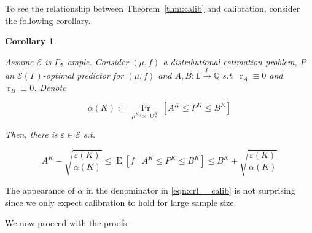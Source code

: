 \documentclass{article}
\numberwithin{equation}{section}
\theoremstyle{definition}
\theoremstyle{plain}
\newtheorem{corollary}{Corollary}[section]
\DeclareMathOperator{\Prb}{Pr}
\DeclareMathOperator{\E}{E}
\DeclareMathOperator{\R}{r}
\DeclareMathOperator{\Un}{U}
\newcommand{\Rats}{\mathbb{Q}}
\newcommand{\GrowA}{\Gamma_{\mathfrak{A}}}
\newcommand{\Fall}{\mathcal{E}}
\newcommand{\EG}{\Fall(\Gamma)}
\newcommand{\Scheme}{\xrightarrow{\Gamma}}
\begin{document}
To see the relationship between Theorem~\ref{thm:calib} and calibration, consider the following corollary.

\begin{corollary}
\label{crl:calib}

Assume $\Fall$ is $\GrowA$-ample. Consider $(\mu,f)$ a distributional estimation problem, $P$ an $\EG$-optimal predictor for $(\mu,f)$ and $A,B: \bm{1} \Scheme \Rats$ s.t. $\R_A \equiv 0$ and $\R_B \equiv 0$. Denote

\[\alpha(K):=\Prb_{\mu^{K_0} \times \Un_P^{K}}[A^{K} \leq P^{K} \leq B^{K}]\] 

Then, there is $\varepsilon \in \Fall$ s.t. 

\begin{equation}
\label{eqn:crl__calib}
A^{K} - \sqrt{\frac{\varepsilon(K)}{\alpha(K)}} \leq \E[f \mid A^{K} \leq P^{K} \leq B^{K}] \leq B^{K} + \sqrt{\frac{\varepsilon(K)}{\alpha(K)}}
\end{equation}

\end{corollary}

The appearance of $\alpha$ in the denominator in \ref{eqn:crl__calib} is not surprising since we only expect calibration to hold for large sample size.

We now proceed with the proofs.
\end{document}
